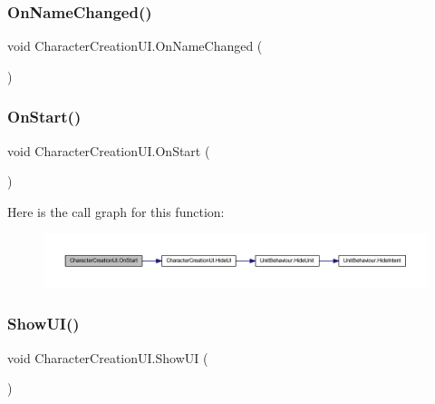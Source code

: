 \subsubsection{\texorpdfstring{OnNameChanged()}{OnNameChanged()}}
{\footnotesize\ttfamily void Character\+Creation\+U\+I.\+On\+Name\+Changed (\begin{DoxyParamCaption}{ }\end{DoxyParamCaption})}

\mbox{\label{class_character_creation_u_i_a656b1552f06f9611f9672489e03f8936}} 
\subsubsection{\texorpdfstring{OnStart()}{OnStart()}}
{\footnotesize\ttfamily void Character\+Creation\+U\+I.\+On\+Start (\begin{DoxyParamCaption}{ }\end{DoxyParamCaption})}

Here is the call graph for this function\+:
\nopagebreak
\begin{figure}[H]
\begin{center}
\leavevmode
\includegraphics[width=350pt]{class_character_creation_u_i_a656b1552f06f9611f9672489e03f8936_cgraph}
\end{center}
\end{figure}
\mbox{\label{class_character_creation_u_i_a5e683c30d28a4c97d8f84de3de2062cd}} 
\subsubsection{\texorpdfstring{ShowUI()}{ShowUI()}}
{\footnotesize\ttfamily void Character\+Creation\+U\+I.\+Show\+UI (\begin{DoxyParamCaption}{ }\end{DoxyParamCaption})}

